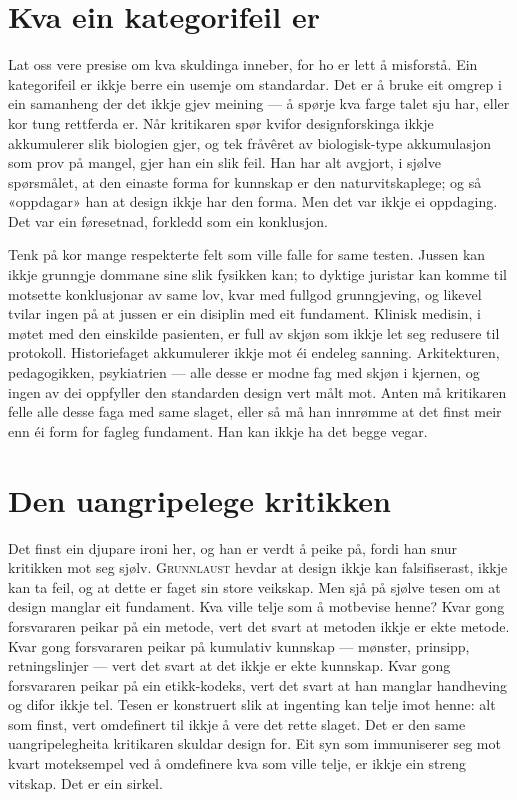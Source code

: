\section{Kva ein kategorifeil er}

Lat oss vere presise om kva skuldinga inneber, for ho er lett å misforstå. Ein kategorifeil er ikkje berre ein usemje om standardar. Det er å bruke eit omgrep i ein samanheng der det ikkje gjev meining — å spørje kva farge talet sju har, eller kor tung rettferda er. Når kritikaren spør kvifor designforskinga ikkje akkumulerer slik biologien gjer, og tek fråvêret av biologisk-type akkumulasjon som prov på mangel, gjer han ein slik feil. Han har alt avgjort, i sjølve spørsmålet, at den einaste forma for kunnskap er den naturvitskaplege; og så «oppdagar» han at design ikkje har den forma. Men det var ikkje ei oppdaging. Det var ein føresetnad, forkledd som ein konklusjon.

Tenk på kor mange respekterte felt som ville falle for same testen. Jussen kan ikkje grunngje dommane sine slik fysikken kan; to dyktige juristar kan komme til motsette konklusjonar av same lov, kvar med fullgod grunngjeving, og likevel tvilar ingen på at jussen er ein disiplin med eit fundament. Klinisk medisin, i møtet med den einskilde pasienten, er full av skjøn som ikkje let seg redusere til protokoll. Historiefaget akkumulerer ikkje mot éi endeleg sanning. Arkitekturen, pedagogikken, psykiatrien — alle desse er modne fag med skjøn i kjernen, og ingen av dei oppfyller den standarden design vert målt mot. Anten må kritikaren felle alle desse faga med same slaget, eller så må han innrømme at det finst meir enn éi form for fagleg fundament. Han kan ikkje ha det begge vegar.

\section{Den uangripelege kritikken}

Det finst ein djupare ironi her, og han er verdt å peike på, fordi han snur kritikken mot seg sjølv. \textsc{Grunnlaust} hevdar at design ikkje kan falsifiserast, ikkje kan ta feil, og at dette er faget sin store veikskap. Men sjå på sjølve tesen om at design manglar eit fundament. Kva ville telje som å motbevise henne? Kvar gong forsvararen peikar på ein metode, vert det svart at metoden ikkje er ekte metode. Kvar gong forsvararen peikar på kumulativ kunnskap — mønster, prinsipp, retningslinjer — vert det svart at det ikkje er ekte kunnskap. Kvar gong forsvararen peikar på ein etikk-kodeks, vert det svart at han manglar handheving og difor ikkje tel. Tesen er konstruert slik at ingenting kan telje imot henne: alt som finst, vert omdefinert til ikkje å vere det rette slaget. Det er den same uangripelegheita kritikaren skuldar design for. Eit syn som immuniserer seg mot kvart moteksempel ved å omdefinere kva som ville telje, er ikkje ein streng vitskap. Det er ein sirkel.


